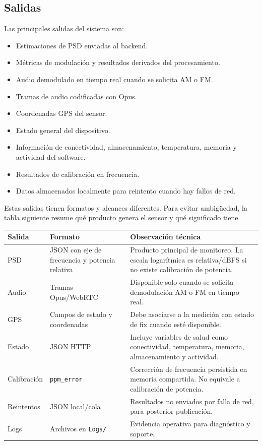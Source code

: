 \subsection{Salidas}

Las principales salidas del sistema son:

\begin{itemize}
  \item Estimaciones de PSD enviadas al backend.
  \item Métricas de modulación y resultados derivados del procesamiento.
  \item Audio demodulado en tiempo real cuando se solicita AM o FM.
  \item Tramas de audio codificadas con Opus.
  \item Coordenadas GPS del sensor.
  \item Estado general del dispositivo.
  \item Información de conectividad, almacenamiento, temperatura, memoria y
  actividad del software.
  \item Resultados de calibración en frecuencia.
  \item Datos almacenados localmente para reintento cuando hay fallos de red.
\end{itemize}

Estas salidas tienen formatos y alcances diferentes. Para evitar ambigüedad, la
tabla siguiente resume qué producto genera el sensor y qué significado tiene.

\begin{longtable}{p{}p{}p{}}
\toprule
\textbf{Salida} & \textbf{Formato} & \textbf{Observación técnica} \\
\midrule
\endhead
PSD & JSON con eje de frecuencia y potencia relativa & Producto principal de monitoreo. La escala logarítmica es relativa/dBFS si no existe calibración de potencia. \\
Audio & Tramas Opus/WebRTC & Disponible solo cuando se solicita demodulación AM o FM en tiempo real. \\
GPS & Campos de estado y coordenadas & Debe asociarse a la medición con estado de fix cuando esté disponible. \\
Estado & JSON HTTP & Incluye variables de salud como conectividad, temperatura, memoria, almacenamiento y actividad. \\
Calibración & \texttt{ppm\_error} & Corrección de frecuencia persistida en memoria compartida. No equivale a calibración de potencia. \\
Reintentos & JSON local/cola & Resultados no enviados por falla de red, para posterior publicación. \\
Logs & Archivos en \texttt{Logs/} & Evidencia operativa para diagnóstico y soporte. \\
\bottomrule
\end{longtable}

